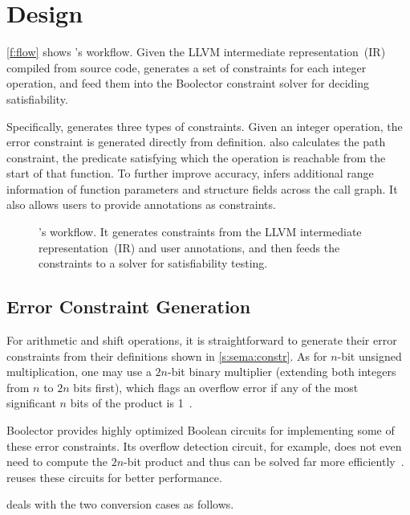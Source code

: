 \section{Design}
\label{s:gen}

\autoref{f:flow} shows \sys's workflow.  Given the LLVM intermediate
representation~(IR) compiled from source code, \sys generates a set
of constraints for each integer operation, and feed them into the
Boolector constraint solver for deciding satisfiability.

Specifically, \sys generates three types of constraints.
%
Given an integer operation, the error constraint is generated
directly from definition.
%
\sys also calculates the path constraint, the predicate satisfying
which the operation is reachable from the start of that function.
%
To further improve accuracy, \sys infers additional range information
of function parameters and structure fields across the call graph.
It also allows users to provide annotations as constraints.

\begin{figure}
\centering
\resizebox{\linewidth}{!}{

}
\caption{\sys's workflow.  It generates constraints from the LLVM
intermediate representation~(IR) and user annotations, and then feeds
the constraints to a solver for satisfiability testing.}
\label{f:flow}
\end{figure}

\subsection{Error Constraint Generation}
\label{s:gen:err}

For arithmetic and shift operations, it is straightforward to
generate their error constraints from their definitions shown in
\autoref{s:sema:constr}.  As for $n$-bit unsigned multiplication,
one may use a $2n$-bit binary multiplier (extending both integers
from $n$ to $2n$ bits first), which flags an overflow error if any
of the most significant $n$ bits of the product is
1~\cite{molnar:catchconv}.

Boolector provides highly optimized Boolean circuits for implementing
some of these error constraints.  Its overflow detection circuit,
for example, does not even need to compute the $2n$-bit product and
thus can be solved far more
efficiently~\cite[\chapterautorefname~3.5]{brummayer:phd}.  \sys
reuses these circuits for better performance.

\sys deals with the two conversion cases as follows.

